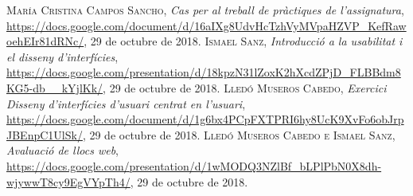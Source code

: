 \documentclass[pdftex,11pt,a4paper]{book}
\begin{document}
\begin{thebibliography}{X}
 \textsc{María Cristina Campos Sancho},
 \textit{Cas per al treball de pràctiques de l'assignatura},
 \url{https://docs.google.com/document/d/16aIXg8UdvHcTzhVyMVpaHZVP_KefRawoehEIr81dRNc/},
  29 de octubre de 2018.
 \textsc{Ismael Sanz},
 \textit{Introducció a la usabilitat i el disseny d'interfícies},
 \url{https://docs.google.com/presentation/d/18kpzN31lZoxK2hXcdZPjD_FLBBdm8KG5-db__kYjlKk/},
  29 de octubre de 2018.
 \textsc{Lledó Museros Cabedo},
 \textit{Exercici Disseny d’interfícies d’usuari centrat en l’usuari},
 \url{https://docs.google.com/document/d/1g6bx4PCpFXTPRI6hy8UcK9XvFo6obJrpJBEnpC1UlSk/},
  29 de octubre de 2018.
 \textsc{Lledó Museros Cabedo e Ismael Sanz},
 \textit{Avaluació de llocs web},
 \url{https://docs.google.com/presentation/d/1wMODQ3NZlBf_bLPlPbN0X8dh-wjywwT8cy9EgVYpTh4/},
  29 de octubre de 2018.
\end{thebibliography}



\appendix




\end{document}

